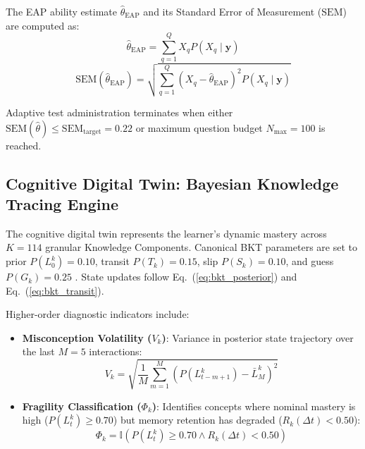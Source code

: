 \documentclass[conference]{IEEEtran}
\begin{document}
The EAP ability estimate $\hat{\theta}_{\text{EAP}}$ and its Standard Error of Measurement ($\text{SEM}$) are computed as:
\begin{equation}
    \hat{\theta}_{\text{EAP}} = \sum_{q=1}^Q X_q P(X_q \mid \mathbf{y})
    \label{eq:eap_estimate}
\end{equation}
\begin{equation}
    \text{SEM}(\hat{\theta}_{\text{EAP}}) = \sqrt{\sum_{q=1}^Q \left( X_q - \hat{\theta}_{\text{EAP}} \right)^2 P(X_q \mid \mathbf{y})}
    \label{eq:eap_sem}
\end{equation}

Adaptive test administration terminates when either $\text{SEM}(\hat{\theta}) \le \text{SEM}_{\text{target}} = 0.22$ or maximum question budget $N_{\max} = 100$ is reached.

\subsection{Cognitive Digital Twin: Bayesian Knowledge Tracing Engine}
The cognitive digital twin represents the learner's dynamic mastery across $K = 114$ granular Knowledge Components. Canonical BKT parameters are set to prior $P(L_0^k) = 0.10$, transit $P(T_k) = 0.15$, slip $P(S_k) = 0.10$, and guess $P(G_k) = 0.25$ \cite{CorbettAnderson1995,BadrinathPardos2025}. State updates follow Eq.~(\ref{eq:bkt_posterior}) and Eq.~(\ref{eq:bkt_transit}).

Higher-order diagnostic indicators include:
\begin{itemize}[leftmargin=*]
    \item \textbf{Misconception Volatility ($V_k$)}: Variance in posterior state trajectory over the last $M = 5$ interactions:
    \begin{equation}
        V_k = \sqrt{\frac{1}{M} \sum_{m=1}^M \left( P(L_{t-m+1}^k) - \bar{L}_M^k \right)^2}
        \label{eq:volatility}
    \end{equation}
    \item \textbf{Fragility Classification ($\Phi_k$)}: Identifies concepts where nominal mastery is high ($P(L_t^k) \ge 0.70$) but memory retention has degraded ($R_k(\Delta t) < 0.50$):
    \begin{equation}
        \Phi_k = \mathbb{I}\left( P(L_t^k) \ge 0.70 \land R_k(\Delta t) < 0.50 \right)
        \label{eq:fragility}
    \end{equation}
\end{itemize}
\end{document}
